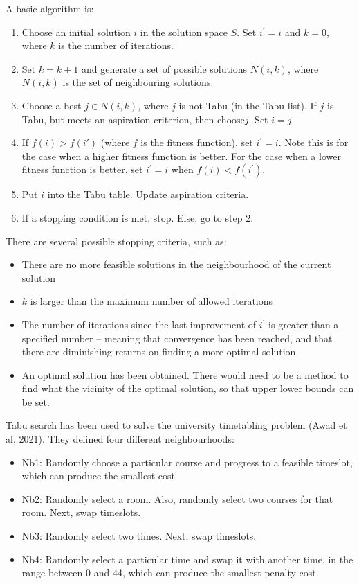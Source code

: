 \documentclass[a4paper, 12pt]{report}
\begin{document}
A basic algorithm is:
\begin{enumerate}
	\item 	Choose an initial solution $i$ in the solution space $S$. Set
	$i^\prime=i$ and $k=0$, where $k$ is the number of iterations.
	\item Set $k=k+1$ and generate a set of possible solutions $N(i,k)$,
	where $N(i,k)$ is the set of neighbouring solutions.
	\item Choose a best $j\in N(i,k)$, where $j$ is not Tabu (in the
	Tabu list). If $j$ is Tabu, but meets an aspiration criterion, then 
	choose$j$. Set $i =j$.
	\item If $f(i)>f(i\prime)$ (where $f$ is the fitness
	function), set $i^\prime=i$. Note this is for the case when a higher fitness
	function is better. For the case when a lower fitness function is better,
	set $i^\prime=i$ when $f(i)<f(i^\prime)$.
	\item Put $i$ into the Tabu table. Update aspiration criteria.
	\item If a stopping condition is met, stop. Else, go to step 2.
\end{enumerate}
There are several possible stopping criteria, such as:
\begin{itemize}
	\item There are no more feasible solutions in the neighbourhood of the
	current solution
	\item $k$ is larger than the maximum number of allowed iterations
	\item The number of iterations since the last improvement of $i^\prime$ is
	greater than a specified number – meaning that convergence has been
	reached, and that there are diminishing returns on finding a more optimal
	solution
	\item An optimal solution has been obtained. There would need to be a
	method to find what the vicinity of the optimal solution, so that upper
	lower bounds can be set.
\end{itemize}
Tabu search has been used to solve the university timetabling problem (Awad et
al, 2021). They defined four different neighbourhoods:
\begin{itemize}
	\item Nb1: Randomly choose a particular course and progress to a feasible
	timeslot, which can produce the smallest cost
	\item Nb2: Randomly select a room. Also, randomly select two courses for
	that room. Next, swap timeslots.
	\item Nb3: Randomly select two times. Next, swap timeslots.
	\item Nb4: Randomly select a particular time and swap it with another time,
	in the range between 0 and 44, which can produce the smallest penalty cost.
\end{itemize}
\end{document}
